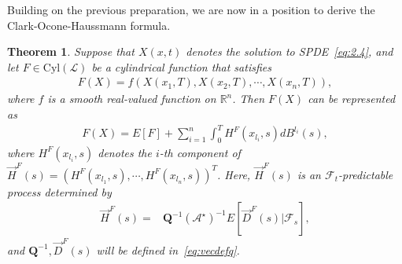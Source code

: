 \documentclass[11pt]{article}
\numberwithin{equation}{section}%
\numberwithin{figure}{section}%
\newtheorem{theorem}{Theorem}[section]
\theoremstyle{remark}
\begin{document}
Building on the previous preparation, we are now in a position to derive the Clark-Ocone-Haussmann formula. 
	\begin{theorem}\label{thm:finiteresp}
		Suppose that $X(x,t)$ denotes the solution to SPDE~\eqref{eq:2.4}, and let $F\in\text{Cyl}(\mathcal{L})$ be a cylindrical function that satisfies
		\begin{align}\label{eq:cyl}
			F(X)=f(X(x_{1},T), X(x_{2},T), \cdots ,X(x_{n},T)),
		\end{align}
		where $f$ is a smooth real-valued function on $\mathbb{R}^{n}$. Then $F(X)$ can be represented as
		\begin{align}\label{eq:3}
			F(X)=E[F]+\sum_{i=1}^{n}\int_{0}^{T}  H^{F}(x_{l_{i}},s)dB^{l_{i}}(s),
		\end{align}
		where $H^{F}(x_{l_{i}},s)$ denotes the $i$-th component of  $\vec{H}^{F}(s)=(H^{F}(x_{l_{1}},s),\cdots,H^{F}(x_{l_{n}},s))^{T}$. Here, $\vec{H}^{F}(s)$ is an $\mathcal{F}_{t}$-predictable process determined by
				\begin{align*}
				\vec{H}^{F}(s)
				=&\mathbf{Q}^{-1}(\mathcal{A}^{\star})^{-1} E[\vec{D}^{F}(s)|\mathcal{F}_{s}],
			\end{align*}
		and $\mathbf{Q}^{-1},\vec{D}^{F}(s)$ will be defined in~\eqref{eq:vecdefq}.
	\end{theorem}
\end{document}
